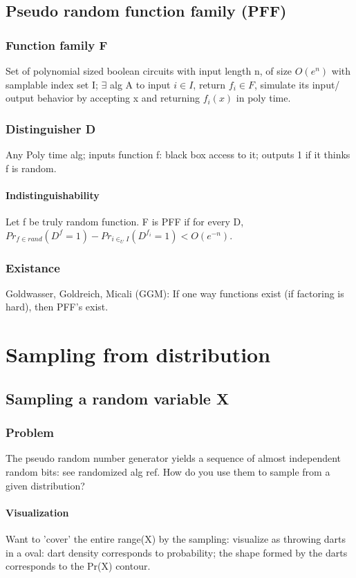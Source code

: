 \documentclass[oneside, article]{memoir}
\begin{document}
\section{Pseudo random function family (PFF)}
\subsection{Function family F}
Set of polynomial sized boolean circuits with input length n, of size $O(e^{n})$ with samplable index set I; $\exists$ alg A to input $i \in I$, return $f_{i} \in F$, simulate its input/ output behavior by accepting x and returning $f_{i}(x)$ in poly time.

\subsection{Distinguisher D}
Any Poly time alg; inputs function f: black box access to it; outputs 1 if it thinks f is random.

\subsubsection{Indistinguishability}
Let f be truly random function. F is PFF if for every D, $Pr_{f \in rand}(D^{f}=1)-Pr_{i \in_{U} I}(D^{f_{i}}=1) < O(e^{-n})$.

\subsection{Existance}
Goldwasser, Goldreich, Micali (GGM): If one way functions exist (if factoring is hard), then PFF's exist.

\tbc


\chapter{Sampling from distribution}
\section{Sampling a random variable X}
\subsection{Problem}
The pseudo random number generator yields a sequence of almost independent random bits: see randomized alg ref. How do you use them to sample from a given distribution?

\subsubsection{Visualization}
Want to 'cover' the entire range(X) by the sampling: visualize as throwing darts in a oval: dart density corresponds to probability; the shape formed by the darts corresponds to the Pr(X) contour.
\end{document}
